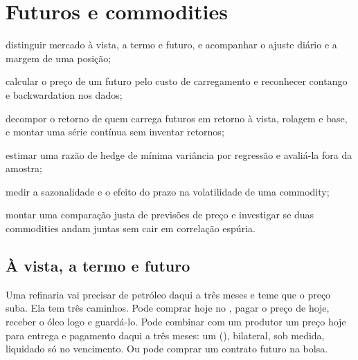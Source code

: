 \chapter{Futuros e commodities}
\label{cap:futuros}


\begin{objetivos}
  \item distinguir mercado à vista, a termo e futuro, e acompanhar o ajuste diário e a margem de uma posição;
  \item calcular o preço de um futuro pelo custo de carregamento e reconhecer contango e backwardation nos dados;
  \item decompor o retorno de quem carrega futuros em retorno à vista, rolagem e base, e montar uma série contínua sem inventar retornos;
  \item estimar uma razão de hedge de mínima variância por regressão e avaliá-la fora da amostra;
  \item medir a sazonalidade e o efeito do prazo na volatilidade de uma commodity;
  \item montar uma comparação justa de previsões de preço e investigar se duas commodities andam juntas sem cair em correlação espúria.
\end{objetivos}

\section{À vista, a termo e futuro}
\label{sec:c09-spot}

Uma refinaria vai precisar de petróleo daqui a três meses e teme que o preço suba. Ela tem três caminhos. Pode comprar hoje no , pagar o preço de hoje, receber o óleo logo e guardá-lo. Pode combinar com um produtor um preço hoje para entrega e pagamento daqui a três meses: um  (), bilateral, sob medida, liquidado só no vencimento. Ou pode comprar um contrato futuro na bolsa.

